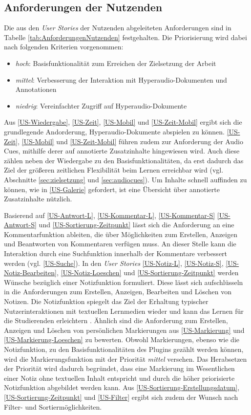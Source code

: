 \subsection{Anforderungen der Nutzenden}
Die aus den \textit{User Stories} der Nutzenden abgeleiteten Anforderungen sind in Tabelle \ref{tab:AnforderungenNutzenden} festgehalten. Die Priorisierung wird dabei nach folgenden Kriterien vorgenommen:

\begin{itemize}
\item \textit{hoch}: Basisfunktionalität zum Erreichen der Zielsetzung der Arbeit
\item \textit{mittel}: Verbesserung der Interaktion mit Hyperaudio-Dokumenten und Annotationen
\item \textit{niedrig}: Vereinfachter Zugriff auf Hyperaudio-Dokumente
\end{itemize}


Aus \ref{US-Wiedergabe}, \ref{US-Zeit}, \ref{US-Mobil} und \ref{US-Zeit-Mobil} ergibt sich die grundlegende Andorderung, Hyperaudio-Dokumente abspielen zu können. \ref{US-Zeit}, \ref{US-Mobil} und \ref{US-Zeit-Mobil} führen zudem zur Anforderung der Audio Cues, mithilfe derer auf annotierte Zusatzinhalte hingewiesen wird. Auch diese zählen neben der Wiedergabe zu den Basisfunktionalitäten, da erst dadurch das Ziel der größeren zeitlichen Flexibilität beim Lernen erreichbar wird (vgl. Abschnitte \ref{sec:zielsetzung} und \ref{sec:audiocues}). Um Inhalte schnell auffinden zu können, wie in \ref{US-Galerie} gefordert, ist eine Übersicht über annotierte Zusatzinhalte nützlich.

Basierend auf \ref{US-Antwort-L}, \ref{US-Kommentar-L}, \ref{US-Kommentar-S} \ref{US-Antwort-S} und \ref{US-Sortierung-Zeitpunkt} lässt sich die Anforderung an eine Kommentarfunktion ableiten, die über Möglichkeiten zum Erstellen, Anzeigen und Beantworten von Kommentaren verfügen muss. An dieser Stelle kann die Interaktion durch eine Suchfunktion innerhalb der Kommentare verbessert werden (vgl. \ref{US-Suche}). In den \textit{User Stories} \ref{US-Notiz-L}, \ref{US-Notiz-S}, \ref{US-Notiz-Bearbeiten}, \ref{US-Notiz-Loeschen} und \ref{US-Sortierung-Zeitpunkt} werden Wünsche bezüglich einer Notizfunktion formuliert. Diese lässt sich aufschlüsseln in die Anforderungen zum Erstellen, Anzeigen, Bearbeiten und Löschen von Notizen. Die Notizfunktion spiegelt das Ziel der Erhaltung typischer Nutzerinteraktionen mit textuellen Lernmedien wieder und kann das Lernen für die Studierenden erleichtern \citep{scutter2010students}. Ähnlich sind die Anforderung zum Erstellen, Anzeigen und Löschen von persönlichen Markierungen aus \ref{US-Markierung} und \ref{US-Markierung-Loeschen} zu bewerten. Obwohl Markierungen, ebenso wie die Notizfunktion, zu den Basisfunktionalitäten des Plugins gezählt werden können, wird die Markierungsfunktion mit der Priorität \textit{mittel} versehen. Das Herabsetzen der Priorität wird dadurch begründet, dass eine Markierung im Wesentlichen einer Notiz ohne textuellen Inhalt entspricht und durch die höher priorisierte Notizfunktion abgebildet werden kann. Aus \ref{US-Sortierung-Erstellungsdatum}, \ref{US-Sortierung-Zeitpunkt} und \ref{US-Filter} ergibt sich zudem der Wunsch nach Filter- und Sortiermöglichkeiten. 

